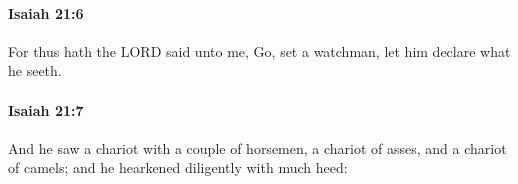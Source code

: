 		\paragraph{Isaiah 21:6} %
			\label{ISAIAH-21-6}

			For thus hath the LORD said unto me, Go, set a watchman, let him declare what he seeth.


		\paragraph{Isaiah 21:7} %
			\label{ISAIAH-21-7}

			And he saw a chariot with a couple of horsemen, a chariot of asses, and a chariot of camels; and he hearkened diligently with much heed:


